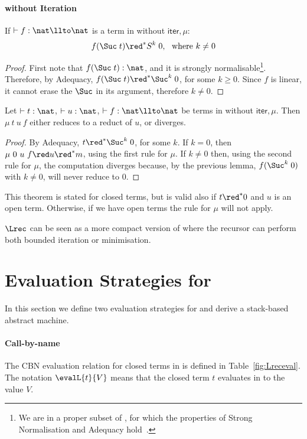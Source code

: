 \documentclass{article}
\begin{document}
\paragraph{\LLCIm without Iteration}

\begin{lemma} If $\vdash f:\nat \llto \nat$ is a term in \LLCIm without $\mathsf{iter}, \mu$:
$$f (\Suc\;t) \red^* S^k\;0,\ \ \text{where}\ k \neq 0$$
\end{lemma}
\begin{proof} First note that $f (\Suc\;t): \nat$, and it is strongly normalisable\footnote{We are in a proper subset of \LLCI, for which the properties of Strong Normalisation and Adequacy hold~\cite{AlvesS:TCS}.}. Therefore, by Adequacy, $f (\Suc\;t)\red^* \Suc^k\;0$, for some $k\geq 0$. Since $f$ is linear, it cannot erase the $\Suc$ in its argument, therefore $k\neq 0$.  
\end{proof}
\begin{theorem} Let $\vdash t:\nat$, $\vdash u:\nat$, $\vdash f:\nat \llto \nat$ be terms in \LLCIm without $\mathsf{iter}, \mu$. Then $\mu\ t\ u\ f$ either 
reduces to a reduct of $u$, or diverges.
\end{theorem}
\begin{proof}
By Adequacy, $t\red^* \Suc^k\;0$, for some $k$. If $k=0$, then $\mu\ 0\ u\ f \red u \red^* m$, using the first rule for $\mu$.  If $k\neq 0$ then, using the second rule for $\mu$, the computation diverges because, by the previous lemma, $f(\Suc^k\;0)$ with $k\neq 0$, will never reduce to $0$.
\end{proof}
This theorem is stated for closed terms, but is valid also if $t\red^* 0$ and $u$ is an open term. Otherwise, if we have open terms the rule for $\mu$ will not apply. 

$\Lrec$ can be seen as a more compact version of \LLCIm where the
recursor can perform both bounded iteration or minimisation.
\section{Evaluation Strategies for \LLCIrec}\label{sec:strat}
In this section we define two evaluation strategies for \LLCIrec and 
derive a stack-based abstract machine.
\paragraph{Call-by-name}
The CBN evaluation relation for closed terms in 
\LLCIrec is defined in Table~\ref{fig:Lreceval}. The notation 
$\evalL{t}{V}$ means that the closed
term $t$ evaluates in \LLCIrec to the value $V$.  
\end{document}
